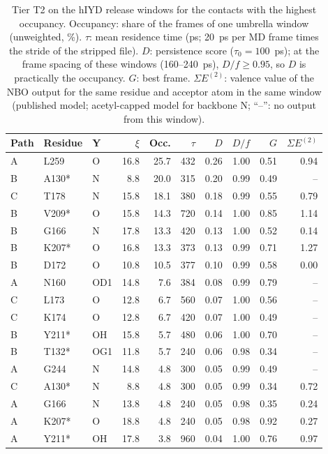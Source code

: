 \begin{table}[!htbp]\centering\scriptsize\setlength{\tabcolsep}{3pt}
\caption{Tier T2 on the hIYD release windows for the contacts with the highest occupancy. Occupancy: share of the frames of one umbrella window (unweighted, \%). $\tau$: mean residence time (ps; 20~ps per MD frame times the stride of the stripped file). $D$: persistence score ($\tau_0 = 100$~ps); at the frame spacing of these windows (160--240~ps), $D/f \ge 0.95$, so $D$ is practically the occupancy. $G$: best frame. $\Sigma E^{(2)}$: valence value of the NBO output for the same residue and acceptor atom in the same window (published model; acetyl-capped model for backbone N; ``--'': no output from this window).}\label{tab:hiydt5}
\begin{tabular}{lllrrrrrrr}\toprule Path & Residue & Y & $\xi$ & Occ. & $\tau$ & $D$ & $D/f$ & $G$ & $\Sigma E^{(2)}$\\\midrule
A & L259 & O & 16.8 & 25.7 & 432 & 0.26 & 1.00 & 0.51 & 0.94\\
B & A130* & N & 8.8 & 20.0 & 315 & 0.20 & 0.99 & 0.49 & --\\
C & T178 & N & 15.8 & 18.1 & 380 & 0.18 & 0.99 & 0.55 & 0.79\\
B & V209* & O & 15.8 & 14.3 & 720 & 0.14 & 1.00 & 0.85 & 1.14\\
B & G166 & N & 17.8 & 13.3 & 420 & 0.13 & 1.00 & 0.52 & 0.14\\
B & K207* & O & 16.8 & 13.3 & 373 & 0.13 & 0.99 & 0.71 & 1.27\\
B & D172 & O & 10.8 & 10.5 & 377 & 0.10 & 0.99 & 0.58 & 0.00\\
A & N160 & OD1 & 14.8 & 7.6 & 384 & 0.08 & 0.99 & 0.79 & --\\
C & L173 & O & 12.8 & 6.7 & 560 & 0.07 & 1.00 & 0.56 & --\\
C & K174 & O & 12.8 & 6.7 & 420 & 0.07 & 1.00 & 0.49 & --\\
B & Y211* & OH & 15.8 & 5.7 & 480 & 0.06 & 1.00 & 0.70 & --\\
B & T132* & OG1 & 11.8 & 5.7 & 240 & 0.06 & 0.98 & 0.34 & --\\
A & G244 & N & 14.8 & 4.8 & 300 & 0.05 & 0.99 & 0.49 & --\\
C & A130* & N & 8.8 & 4.8 & 300 & 0.05 & 0.99 & 0.34 & 0.72\\
A & G166 & N & 13.8 & 4.8 & 240 & 0.05 & 0.98 & 0.35 & 0.24\\
A & K207* & O & 18.8 & 4.8 & 240 & 0.05 & 0.98 & 0.92 & 0.27\\
A & Y211* & OH & 17.8 & 3.8 & 960 & 0.04 & 1.00 & 0.76 & 0.97\\

\end{tabular}
\end{table}
